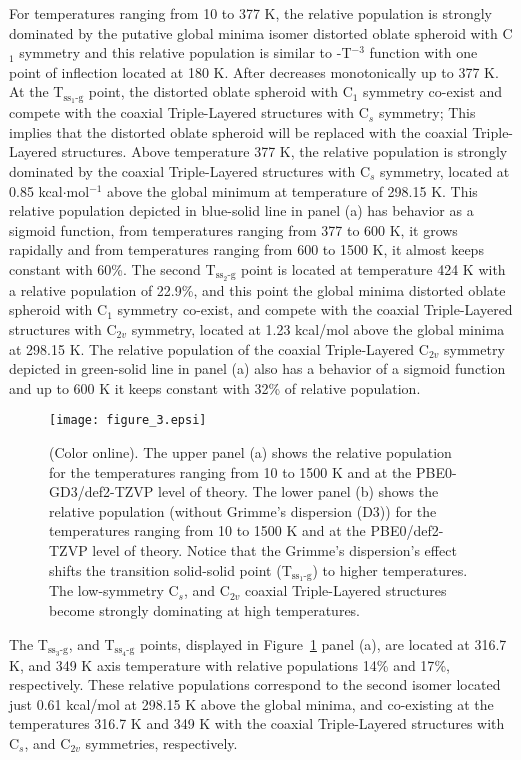 \documentclass[prb,aps,preprint,showkeys,showpacs]{revtex4}
\begin{document}
For temperatures ranging from 10 to 377 K, the relative population is strongly dominated by the putative global minima isomer distorted oblate spheroid with C$_1$ symmetry and this relative population is similar to -T$^{ -3}$ function with one point of inflection located at 180 K. After decreases monotonically up to 377 K.  At the {\large{T$_{\textrm{ss$_1$-g}}$}} point, the distorted oblate spheroid with C$_1$ symmetry co-exist and compete with the coaxial Triple-Layered structures with C$_s$ symmetry; This implies that the distorted oblate spheroid will be replaced with the coaxial Triple-Layered structures. Above temperature 377 K, the relative population is strongly dominated by the coaxial Triple-Layered structures with C$_s$ symmetry, located at 0.85 kcal$\cdot$mol$^{-1}$ above the global minimum at temperature of 298.15 K. This relative population depicted in blue-solid line in panel (a) has behavior as a  sigmoid function, from temperatures ranging from 377 to 600 K, it grows rapidally and from temperatures ranging from 600 to 1500 K, it almost keeps constant with 60{\%}. The second {\large{T$_{\textrm{ss$_2$-g}}$}} point is located at temperature 424 K with a relative population of 22.9{\%}, and this point the global minima distorted oblate spheroid with C$_1$ symmetry co-exist, and compete with the coaxial Triple-Layered structures with C$_{2v}$ symmetry, located at 1.23 kcal/mol above the global minima at 298.15 K.  The relative population of the coaxial Triple-Layered C$_{2v}$ symmetry depicted in green-solid line in panel (a) also has a behavior of a sigmoid function and up to 600 K it keeps constant with 32{\%} of relative population.
\begin{figure}[ht!]
  \begin{center}  
    \texttt{[image: figure\_3.epsi]}
    \caption{(Color online). The upper panel (a) shows the relative population for the temperatures ranging from 10 to 1500 K and at the PBE0-GD3/def2-TZVP level of theory. The lower panel (b) shows the relative population (without  Grimme's dispersion (D3)) for the temperatures ranging from 10 to 1500 K and at the PBE0/def2-TZVP level of theory. Notice that the Grimme's dispersion's effect shifts the transition solid-solid point ({\large{T$_{\textrm{ss$_1$-g}}$}}) to higher temperatures. The low-symmetry  C$_s$, and  C$_{2v}$ coaxial Triple-Layered structures become strongly dominating at high temperatures.}
    \label{popu}
  \end{center}
  \end{figure}
The {\large{T$_{\textrm{ss$_3$-g}}$}}, and  {\large{T$_{\textrm{ss$_4$-g}}$}} points, displayed in Figure~\ref{popu} panel (a), are located at 316.7 K, and 349 K  axis temperature with relative populations 14{\%} and 17{\%}, respectively. These relative populations correspond to the second isomer located just 0.61 kcal/mol at 298.15 K above the global minima, and co-existing at the temperatures 316.7 K and 349 K with the coaxial Triple-Layered structures with C$_s$, and C$_{2v}$ symmetries, respectively.
\end{document}
